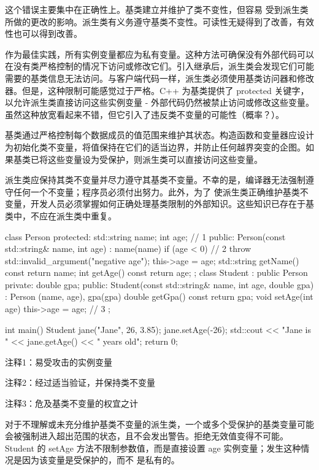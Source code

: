 这个错误主要集中在正确性上。基类建立并维护了类不变性，但容易 受到派生类所做的更改的影响。派生类有义务遵守基类不变性。可读性无疑得到了改善，有效性也可以得到改善。

作为最佳实践，所有实例变量都应为私有变量。这种方法可确保没有外部代码可以在没有类严格控制的情况下访问或修改它们。引入继承后，派生类会发现它们可能需要的基类信息无法访问。与客户端代码一样，派生类必须使用基类访问器和修改器。但是，这种限制可能感觉过于严格。C++ 为基类提供了 protected 关键字，以允许派生类直接访问这些实例变量 - 外部代码仍然被禁止访问或修改这些变量。虽然这种放宽看起来不错，但它引入了违反类不变量的可能性（概率？）。


基类通过严格控制每个数据成员的值范围来维护其状态。构造函数和变量器应设计为初始化类不变量，将值保持在它们的适当边界，并防止任何越界突变的企图。如果基类已将这些变量设为受保护，则派生类可以直接访问这些变量。

派生类应保持其类不变量并尽力遵守其基类不变量。不幸的是，编译器无法强制遵守任何一个不变量；程序员必须付出努力。此外，为了 使派生类正确维护基类不变量，开发人员必须掌握如何正确处理基类限制的外部知识。这些知识已存在于基类中，不应在派生类中重复。


\begin{cpp}
class Person {
protected:
  std::string name;
  int age; // 1
public:
  Person(const std::string& name, int age) : name(name) {
    if (age < 0) // 2
      throw std::invalid_argument("negative age");
    this->age = age;
  }
  std::string getName() const { return name; }
  int getAge() const { return age; }
};
class Student : public Person {
private:
  double gpa;
public:
  Student(const std::string& name, int age, double gpa) : Person
  (name, age), gpa(gpa) {}
  double getGpa() const { return gpa; }
  void setAge(int age) { this->age = age; } // 3
};

int main() {
  Student jane("Jane", 26, 3.85);
  jane.setAge(-26);
  std::cout << "Jane is " << jane.getAge() << " years old\n";
  return 0;
}
\end{cpp}

{\footnotesize
注释1：易受攻击的实例变量

注释2：经过适当验证，并保持类不变量

注释3：危及基类不变量的权宜之计
}


对于不理解或未充分维护基类不变量的派生类，一个或多个受保护的基类变量可能会被强制进入超出范围的状态，且不会发出警告。拒绝无效值变得不可能。Student 的 setAge 方法不限制参数值，而是直接设置 age 实例变量；发生这种情况是因为该变量是受保护的，而不 是私有的。

